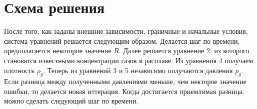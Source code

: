 \section{Схема решения}
\par После того, как заданы внешние зависимости, граничные и начальные условия, система уравнений решается следующим образом. Делается шаг по времени, предполагается некоторое значение $R$. Далее решается уравнение 2, из которого становятся известными концентрации газов в расплаве. Из уравнения 4 получаем плотность $\rho_{g}$. Теперь из уравнений 3 и 5 независимо получаются давления $p_{g}$. Если разница между полученными давлениями меньше, чем некторое значение ошибки, то делается новая иттерация. Когда достигается приемлимая разница, можно сделать следующий шаг по времени. 
